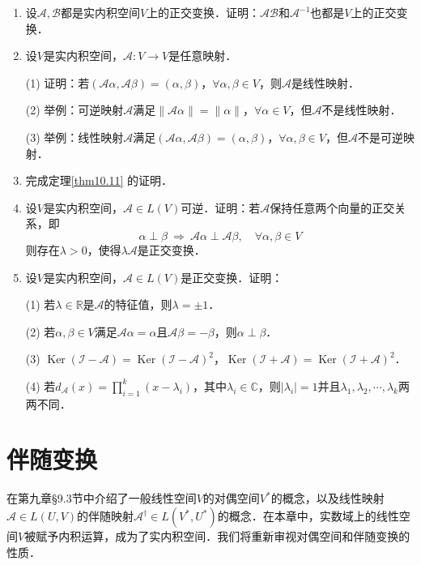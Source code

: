 \documentclass[a4paper,fontset=windows]{ctexbook}
\theoremstyle{definition}
\DeclareMathOperator{\Ker}{Ker}
\begin{document}
\begin{enumerate}
\item 设$\mathcal{A,B}$都是实内积空间$V$上的正交变换．证明：$\mathcal{AB}$和$\mathcal{A}^{-1}$也都是$V$上的正交变换．

\item 设$V$是实内积空间，$\mathcal{A}:V\to V$是任意映射．

(1) 证明：若$(\mathcal{A}\alpha,\mathcal{A}\beta)=(\alpha,\beta)$，$\forall\alpha,\beta\in V$，则$\mathcal{A}$是线性映射．

(2) 举例：可逆映射$\mathcal{A}$满足$\|\mathcal{A}\alpha\|=\|\alpha\|$，$\forall\alpha\in V$，但$\mathcal{A}$不是线性映射．

(3) 举例：线性映射$\mathcal{A}$满足$(\mathcal{A}\alpha,\mathcal{A}\beta)=(\alpha,\beta)$，$\forall\alpha,\beta\in V$，但$\mathcal{A}$不是可逆映射．

\item 完成定理\ref{thm10.11} 的证明．

\item 设$V$是实内积空间，$\mathcal{A}\in L(V)$可逆．证明：若$\mathcal{A}$保持任意两个向量的正交关系，即
$$\alpha\perp\beta~\Rightarrow~\mathcal{A}\alpha\perp\mathcal{A}\beta,\quad\forall\alpha,\beta\in V$$
则存在$\lambda>0$，使得$\lambda\mathcal{A}$是正交变换．

\item 设$V$是实内积空间，$\mathcal{A}\in L(V)$是正交变换．证明：

(1) 若$\lambda\in\mathbb{R}$是$\mathcal{A}$的特征值，则$\lambda=\pm 1$．

(2) 若$\alpha,\beta\in V$满足$\mathcal{A}\alpha=\alpha$且$\mathcal{A}\beta=-\beta$，则$\alpha\perp\beta$．

(3) $\Ker(\mathcal{I-A})=\Ker(\mathcal{I-A})^2$，$\Ker(\mathcal{I+A})=\Ker(\mathcal{I+A})^2$．

(4) 若$d_{\mathcal{A}}(x)=\prod\limits_{i=1}^k(x-\lambda_i)$，其中$\lambda_i\in\mathbb{C}$，则$|\lambda_i|=1$并且$\lambda_1,\lambda_2,\cdots,\lambda_k$两两不同．

\end{enumerate}

\clearpage\section{伴随变换}

在第九章\S 9.3节中介绍了一般线性空间$V$的对偶空间$V^*$的概念，以及线性映射$\mathcal{A}\in L(U,V)$的伴随映射$\mathcal{A}^\dagger\in L(V^*,U^*)$的概念．在本章中，实数域上的线性空间$V$被赋予内积运算，成为了实内积空间．我们将重新审视对偶空间和伴随变换的性质．
\end{document}
